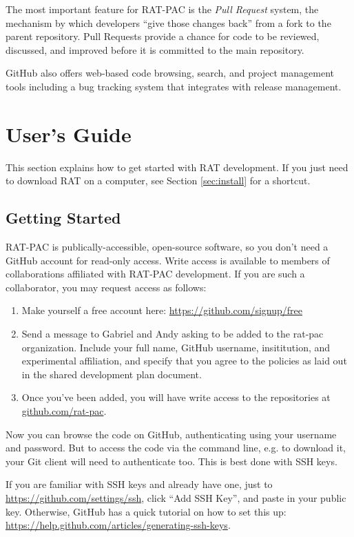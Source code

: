 \documentclass{article}
\begin{document}
The most important feature for RAT-PAC is the {\it Pull Request} system, the
mechanism by which developers ``give those changes back'' from a fork to the
parent repository. Pull Requests provide a chance for code to be reviewed,
discussed, and improved before it is committed to the main repository.

GitHub also offers web-based code browsing, search, and project management
tools including a bug tracking system that integrates with release management.

\section{User's Guide}
This section explains how to get started with RAT development. If you just
need to download RAT on a computer, see Section \ref{sec:install} for a
shortcut.

\subsection{Getting Started}
\label{sec:getting-started}
RAT-PAC is publically-accessible, open-source software, so you don't need a
GitHub account for read-only access. Write access is available to members
of collaborations affiliated with RAT-PAC development. If you are such a
collaborator, you may request access as follows:

\begin{enumerate}
\item Make yourself a free account here:
      \href{https://github.com/signup/free}{https://github.com/signup/free}
\item Send a message to Gabriel and Andy asking to be added to the rat-pac
      organization. Include your full name, GitHub username, insititution,
      and experimental affiliation, and specify that you agree to the policies
      as laid out in the shared development plan document.
\item Once you've been added, you will have write access to the
      repositories at \href{http://github.com/rat-pac}{github.com/rat-pac}.
\end{enumerate}

Now you can browse the code on GitHub, authenticating using your username
and password. But to access the code via the command line, e.g. to download it,
your Git client will need to authenticate too. This is best done with SSH keys.

If you are familiar with SSH keys and already have one, just to
\href{https://github.com/settings/ssh}{https://github.com/settings/ssh},
click ``Add SSH Key'', and paste in your public key. Otherwise, GitHub has a
quick tutorial on how to set this up:
\href{https://help.github.com/articles/generating-ssh-keys}{https://help.github.com/articles/generating-ssh-keys}.
\end{document}
